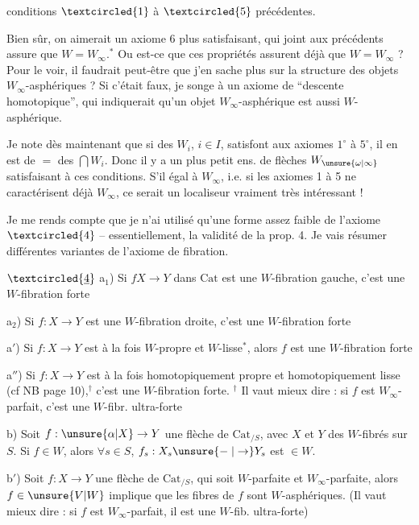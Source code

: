
conditions $\textcircled{1}$ à $\textcircled{5}$ précédentes.


Bien sûr, on aimerait un axiome 6 plus satisfaisant, qui joint aux précédents assure que $W=W_\infty$.$^*$ Ou est-ce que ces propriétés assurent déjà que $W=W_\infty$ ? Pour le voir, il faudrait peut-être que j'en sache plus sur la structure des objets $W_\infty$-asphériques ? Si c'était faux, je songe à un axiome de ``descente homotopique'', qui indiquerait qu'un objet $W_\infty$-asphérique est aussi $W$-asphérique.

Je note dès maintenant que si des $W_i$, $i\in I$, satisfont aux axiomes $1^\circ$ à $5^\circ$, il en est de $=$ des $\bigcap W_i$. Donc il y a un plus petit ens. de flèches $W_{\unsure{\omega|\infty}}$ satisfaisant à ces conditions. S'il  égal à $W_\infty$, i.e. si les axiomes 1 à 5 ne caractérisent déjà $W_\infty$, ce serait un  localiseur vraiment très intéressant !


Je me rends compte que je n'ai utilisé qu'une forme assez faible de l'axiome $\textcircled{4}$ -- essentiellement, la validité de la prop. 4. Je vais résumer différentes variantes de l'axiome de fibration.

$\textcircled{\underline{4}}$ a$_1$) Si $f$\unsure{$:$|$\in$}$X\to Y$ dans $\mathrm{Cat}$ est une $W$-fibration gauche, c'est une $W$-fibration  forte

a$_2$) Si $f:X\to Y$ est une $W$-fibration droite, c'est une $W$-fibration  forte

a$'$) Si $f:X\to Y$ est  à la fois $W$-propre et $W$-lisse$^*$, alors $f$ est une $W$-fibration  forte


a$''$) Si $f:X\to Y$ est à la fois homotopiquement propre et homotopiquement lisse (cf NB page 10),$^{\dagger}$ c'est une $W$-fibration  forte. $^{\dagger}$ Il vaut mieux dire : si $f$ est $W_\infty$-parfait, c'est une $W$-fibr. ultra-forte

b) Soit $f:\unsure{\alpha|X}\to Y$ une flèche de $\mathrm{Cat}_{/S}$, avec $X$ et $Y$ des $W$-fibrés sur $S$. Si $f\in W$, alors $\forall s\in S$, $f_s:X_s\unsure{\mathrel{-}|\to}Y_s$ est $\in W$.

b$'$) Soit $f:X\to Y$ une flèche de $\mathrm{Cat}_{/S}$, qui soit  $W$-parfaite et $W_\infty$-parfaite,  alors $f\in\unsure{V|W}$ implique que les fibres de $f$ sont $W$-asphériques. (Il vaut mieux dire : si $f$ est $W_\infty$-parfait, il est une $W$-fib. ultra-forte)

